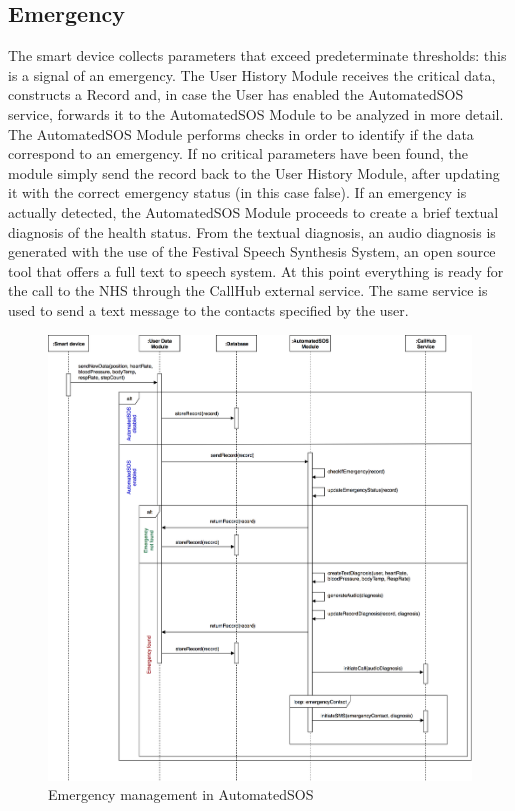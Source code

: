 \subsection{Emergency}

The smart device collects parameters that exceed predeterminate thresholds: this is a signal of an emergency.
The User History Module receives the critical data, constructs a Record and, in case the User has enabled the AutomatedSOS service, forwards it to the AutomatedSOS Module to be analyzed in more detail.
The AutomatedSOS Module performs checks in order to identify if the data correspond to an emergency. If no critical parameters have been found, the module simply send the record back to the User History Module, after updating it with the correct emergency status (in this case false). If an emergency is actually detected, the AutomatedSOS Module proceeds to create a brief textual diagnosis of the health status. From the textual diagnosis, an audio diagnosis is generated with the use of the Festival Speech Synthesis System, an open source tool that offers a full text to speech system. At this point everything is ready for the call to the NHS through the CallHub external service. The same service is used to send a text message to the contacts specified by the user.
\begin{figure}[H]

    \centering
    \includegraphics[scale=0.15]{./Pictures/sequence-emergency.png}
    \caption{Emergency management in AutomatedSOS}
    
\end{figure}

